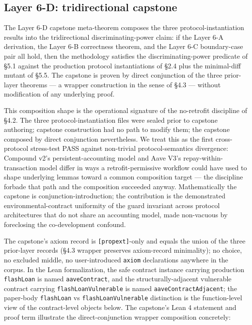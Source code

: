 \subsection{Layer 6-D: tridirectional
capstone}\label{layer-6-d-tridirectional-capstone}

The Layer 6-D capstone meta-theorem composes the three
protocol-instantiation results into the tridirectional
discriminating-power claim: if the Layer 6-A derivation, the Layer 6-B
correctness theorem, and the Layer 6-C boundary-case pair all hold, then
the methodology satisfies the discriminating-power predicate of §5.1
against the production protocol instantiations of §2.4 plus the
minimal-diff mutant of §5.5. The capstone is proven by direct
conjunction of the three prior-layer theorems --- a wrapper construction
in the sense of §4.3 --- without modification of any underlying proof.

This composition shape is the operational signature of the no-retrofit
discipline of §4.2. The three protocol-instantiation files were sealed
prior to capstone authoring; capstone construction had no path to modify
them; the capstone composed by direct conjunction nevertheless. We treat
this as the first cross-protocol stress-test PASS against non-trivial
protocol-semantics divergence: Compound v2's persistent-accounting model
and Aave V3's repay-within-transaction model differ in ways a
retrofit-permissive workflow could have used to shape underlying lemmas
toward a common composition target --- the discipline forbade that path
and the composition succeeded anyway. Mathematically the capstone is
conjunction-introduction; the contribution is the demonstrated
environmental-contract uniformity of the guard invariant across protocol
architectures that do not share an accounting model, made non-vacuous by
foreclosing the co-development confound.

The capstone's axiom record is \texttt{{[}propext{]}}-only and equals
the union of the three prior-layer records (§4.3 wrapper preserves
axiom-record minimality); no choice, no excluded middle, no
user-introduced \texttt{axiom} declarations anywhere in the corpus. In
the Lean formalization, the safe contract instance carrying production
\texttt{flashLoan} is named \texttt{aaveContract}, and the
structurally-adjacent vulnerable contract carrying
\texttt{flashLoanVulnerable} is named \texttt{aaveContractAdjacent}; the
paper-body \texttt{flashLoan} vs \texttt{flashLoanVulnerable}
distinction is the function-level view of the contract-level objects
below. The capstone's Lean 4 statement and proof term illustrate the
direct-conjunction wrapper composition concretely:

